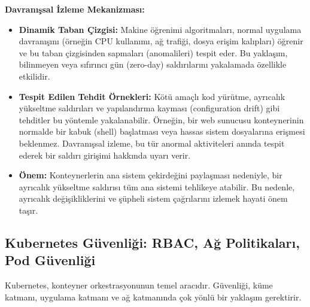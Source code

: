 \textbf{Davranışsal İzleme Mekanizması:}
\begin{itemize}
    \item \textbf{Dinamik Taban Çizgisi:} Makine öğrenimi algoritmaları, normal uygulama davranışını (örneğin CPU kullanımı, ağ trafiği, dosya erişim kalıpları) öğrenir ve bu taban çizgisinden sapmaları (anomalileri) tespit eder. Bu yaklaşım, bilinmeyen veya sıfırıncı gün (zero-day) saldırılarını yakalamada özellikle etkilidir.
    \item \textbf{Tespit Edilen Tehdit Örnekleri:} Kötü amaçlı kod yürütme, ayrıcalık yükseltme saldırıları ve yapılandırma kayması (configuration drift) gibi tehditler bu yöntemle yakalanabilir. Örneğin, bir web sunucusu konteynerinin normalde bir kabuk (shell) başlatması veya hassas sistem dosyalarına erişmesi beklenmez. Davranışsal izleme, bu tür anormal aktiviteleri anında tespit ederek bir saldırı girişimi hakkında uyarı verir.
    \item \textbf{Önem:} Konteynerlerin ana sistem çekirdeğini paylaşması nedeniyle, bir ayrıcalık yükseltme saldırısı tüm ana sistemi tehlikeye atabilir. Bu nedenle, ayrıcalık değişikliklerini ve şüpheli sistem çağrılarını izlemek hayati önem taşır.
\end{itemize}

\subsection{Kubernetes Güvenliği: RBAC, Ağ Politikaları, Pod Güvenliği}

Kubernetes, konteyner orkestrasyonunun temel aracıdır. Güvenliği, küme katmanı, uygulama katmanı ve ağ katmanında çok yönlü bir yaklaşım gerektirir.

